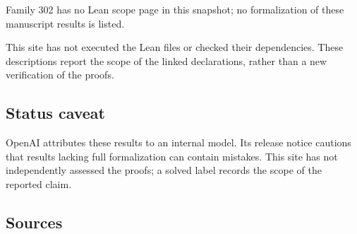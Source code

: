 \documentclass[11pt]{article}
\begin{document}
Family 302 has no Lean scope page in this snapshot; no formalization of these manuscript results is listed.

This site has not executed the Lean files or checked their dependencies. These descriptions report the scope of the linked declarations, rather than a new verification of the proofs.

\subsection{Status caveat}
OpenAI attributes these results to an internal model. Its release notice cautions that results lacking full formalization can contain mistakes. This site has not independently assessed the proofs; a solved label records the scope of the reported claim.

\subsection{Sources}
\end{document}
